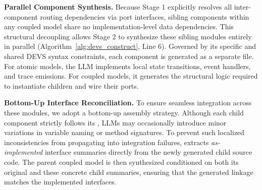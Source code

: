 \noindent\textbf{Parallel Component Synthesis.} 
Because Stage 1 explicitly resolves all inter-component routing dependencies via port interfaces, sibling components within any coupled model share no implementation-level data dependencies. This structural decoupling allows Stage 2 to synthesize these sibling modules entirely in parallel (Algorithm~\ref{alg:devs_construct}, Line 6). Governed by its specific \modelplan{} and shared DEVS syntax constraints, each component is generated as a separate file. For atomic models, the LLM implements local state transitions, event handlers, and trace emissions. For coupled models, it generates the structural logic required to instantiate children and wire their ports.


\noindent\textbf{Bottom-Up Interface Reconciliation.} 
To ensure seamless integration across these modules, we adopt a bottom-up assembly strategy. Although each child component strictly follows its \modelplan{}, LLMs may occasionally introduce minor variations in variable naming or method signatures. To prevent such localized inconsistencies from propagating into integration failures, \methodname{} extracts \emph{as-implemented} interface summaries directly from the newly generated child source code. The parent coupled model is then synthesized conditioned on both its original \modelplan{} and these concrete child summaries, ensuring that the generated linkage matches the implemented interfaces.

